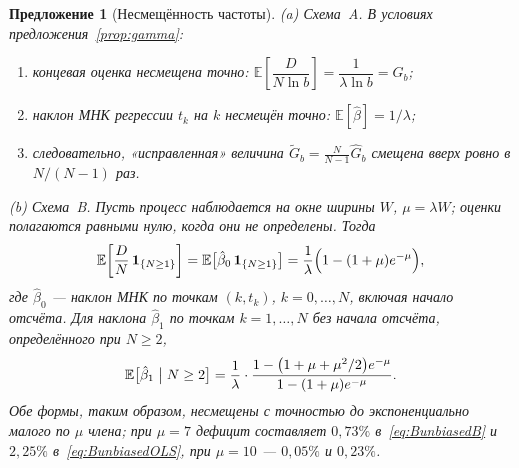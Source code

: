 \documentclass[11pt,a4paper]{article}
\theoremstyle{plain}
\newtheorem{proposition}{Предложение}
\theoremstyle{remark}
\begin{document}
\begin{proposition}[Несмещённость частоты]\label{prop:unbiased}
\emph{(a) Схема~A.} В условиях предложения~\ref{prop:gamma}:
\begin{enumerate}
\item[\rm(i)] концевая оценка несмещена точно:
$\mathbb E\!\left[\dfrac{D}{N\ln b}\right]=\dfrac{1}{\lambda\ln b}=G_b$;
\item[\rm(ii)] наклон МНК регрессии $t_k$ на $k$ несмещён точно:
$\mathbb E[\hat\beta]=1/\lambda$;
\item[\rm(iii)] следовательно, «исправленная» величина
$\tilde G_b=\frac{N}{N-1}\hat G_b$ смещена \emph{вверх} ровно в $N/(N-1)$ раз.
\end{enumerate}
\emph{(b) Схема~B.} Пусть процесс наблюдается на окне ширины $W$, $\mu=\lambda W$;
оценки полагаются равными нулю, когда они не определены. Тогда
\begin{equation}\label{eq:BunbiasedB}
\mathbb E\!\left[\frac{D}{N}\,\mathbf 1_{\{N\ge1\}}\right]
=\mathbb E\bigl[\hat\beta_0\,\mathbf 1_{\{N\ge1\}}\bigr]
=\frac{1}{\lambda}\Bigl(1-(1+\mu)e^{-\mu}\Bigr),
\end{equation}
где $\hat\beta_0$ --- наклон МНК по точкам $(k,t_k)$, $k=0,\dots,N$, \emph{включая}
начало отсчёта. Для наклона $\hat\beta_1$ по точкам $k=1,\dots,N$ \emph{без}
начала отсчёта, определённого при $N\ge2$,
\begin{equation}\label{eq:BunbiasedOLS}
\mathbb E\bigl[\hat\beta_1\bigm|N\ge2\bigr]
=\frac{1}{\lambda}\cdot
\frac{1-\bigl(1+\mu+\mu^2/2\bigr)e^{-\mu}}{1-(1+\mu)e^{-\mu}} .
\end{equation}
Обе формы, таким образом, несмещены с точностью до экспоненциально малого по
$\mu$ члена; при $\mu=7$ дефицит составляет $0{,}73\%$ в~\eqref{eq:BunbiasedB} и
$2{,}25\%$ в~\eqref{eq:BunbiasedOLS}, при $\mu=10$ --- $0{,}05\%$ и $0{,}23\%$.
\end{proposition}
\end{document}
